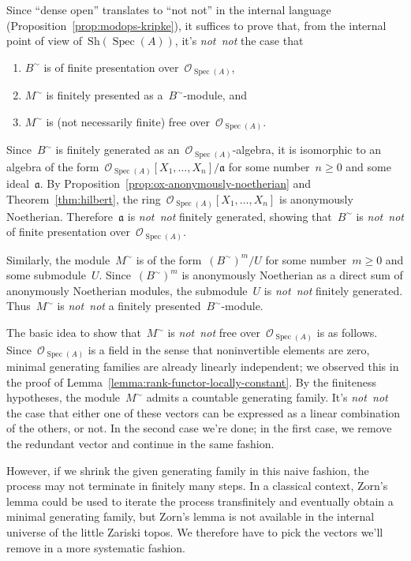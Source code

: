 \documentclass[10pt,reqno,a4paper]{amsbook}
\makeatletter
\theoremstyle{definition}
\theoremstyle{plain}
\theoremstyle{remark}
\renewcommand{\O}{\mathcal{O}}
\newcommand{\aaa}{\mathfrak{a}}
\newcommand{\Sh}{\mathrm{Sh}}
\DeclareMathOperator{\Spec}{Spec}
\newcommand{\?}{\,{:}\,}
\renewcommand{\_}{\mathpunct{.}\,}
\newcommand{\notnot}{\emph{not~not}\xspace}
\renewenvironment{proof}[1][\proofname]{\par
  \pushQED{\qed}%
  \normalfont \topsep6\p@\@plus6\p@\relax
  \trivlist
  \item[\hskip\labelsep
        \itshape
    #1\@addpunct{.}]\ignorespaces
}{%
  \popQED\endtrivlist\@endpefalse
}
\makeatother
\begin{document}
\begin{proof}[Proof of Theorem~\ref{thm:generic-freeness}]
Since ``dense open'' translates to ``not not'' in the internal language
(Proposition~\ref{prop:modops-kripke}), it suffices to prove that, from the
internal point of view of~$\Sh(\Spec(A))$, it's \notnot the case that
\begin{enumerate}
\item $B^\sim$ is of finite presentation over~$\O_{\Spec(A)}$,
\item $M^\sim$ is finitely presented as a~$B^\sim$-module, and
\item $M^\sim$ is (not necessarily finite) free over~$\O_{\Spec(A)}$.
\end{enumerate}

Since~$B^\sim$ is finitely generated as an~$\O_{\Spec(A)}$-algebra, it is
isomorphic to an algebra of the form~$\O_{\Spec(A)}[X_1,\ldots,X_n]/\aaa$ for
some number~$n \geq 0$ and some ideal~$\aaa$. By
Proposition~\ref{prop:ox-anonymously-noetherian} and Theorem~\ref{thm:hilbert}, the
ring~$\O_{\Spec(A)}[X_1,\ldots,X_n]$ is anonymously Noetherian. Therefore~$\aaa$ is
\notnot finitely generated, showing that~$B^\sim$ is \notnot of finite
presentation over~$\O_{\Spec(A)}$.

Similarly, the module~$M^\sim$ is of the form~$(B^\sim)^m/U$ for some number~$m
\geq 0$ and some submodule~$U$. Since~$(B^\sim)^m$ is anonymously Noetherian as a
direct sum of anonymously Noetherian modules, the submodule~$U$ is \notnot finitely
generated. Thus~$M^\sim$ is \notnot a finitely presented~$B^\sim$-module.

The basic idea to show that~$M^\sim$ is \notnot free over~$\O_{\Spec(A)}$ is as
follows. Since~$\O_{\Spec(A)}$ is a field in the sense that noninvertible
elements are zero, minimal generating families are already linearly independent;
we observed this in the proof of Lemma~\ref{lemma:rank-functor-locally-constant}.
By the finiteness hypotheses, the module~$M^\sim$ admits a countable
generating family. It's \notnot the case that either one of these vectors can be
expressed as a linear combination of the others, or not. In the second case
we're done; in the first case, we remove the redundant vector and continue in
the same fashion.

However, if we shrink the given generating family in this naive fashion, the
process may not terminate in finitely many steps. In a classical context,
Zorn's lemma could be used to iterate the process transfinitely and eventually
obtain a minimal generating family, but Zorn's lemma is not available in the
internal universe of the little Zariski topos. We therefore have to pick the
vectors we'll remove in a more systematic fashion.


\end{proof}
\end{document}
